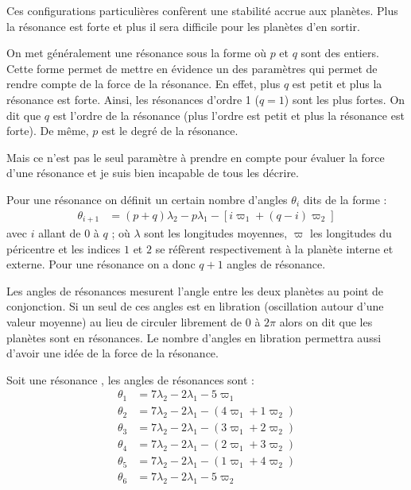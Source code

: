 Ces configurations particulières confèrent une stabilité accrue aux planètes. Plus la résonance est forte et plus il sera difficile pour les planètes d'en sortir.

\bigskip

On met généralement une résonance sous la forme  où $p$ et $q$ sont des entiers. Cette forme permet de mettre en
évidence un des paramètres qui permet de rendre compte de la force de la résonance. En effet, plus $q$ est petit et plus la
résonance est forte. Ainsi, les résonances d'ordre 1 ($q=1$) sont les plus fortes. On dit que $q$ est l'ordre de la résonance
(plus l'ordre est petit et plus la résonance est forte). De même, $p$ est le degré de la résonance.

\begin{attention}
Mais ce n'est pas le seul paramètre à prendre en compte pour évaluer la force d'une résonance et je suis bien incapable de tous les décrire.
\end{attention}

Pour une résonance  on définit un certain nombre d'angles $\theta_i$ dits  de la forme :
\begin{align}
\theta_{i+1} &=(p+q)\lambda_2 -p\lambda_1 - \left[i\varpi_{1} + (q-i)\varpi_2\right]
\end{align}
avec $i$ allant de $0$ à $q$ ; où $\lambda$ sont les longitudes moyennes, $\varpi$ les longitudes du péricentre et les indices
$1$ et $2$ se réfèrent respectivement à la planète interne et externe. Pour une résonance  on a donc $q+1$ angles
de résonance.

Les angles de résonances mesurent l'angle entre les deux planètes au point de conjonction. Si un seul de ces angles est en libration (oscillation autour d'une valeur moyenne) au lieu de circuler librement de $0$ à $2\pi$ alors on dit que les planètes sont en résonances. Le nombre d'angles en libration permettra aussi d'avoir une idée de la force de la résonance.

\begin{exemple}
Soit une résonance , les angles de résonances sont :
\begin{align*}
\theta_1 &= 7 \lambda_2 -2\lambda_1 - 5 \varpi_1\\
\theta_2 &= 7 \lambda_2 -2\lambda_1 - \left( 4 \varpi_1 + 1\varpi_2 \right)\\
\theta_3 &= 7 \lambda_2 -2\lambda_1 - \left( 3 \varpi_1 + 2\varpi_2 \right)\\
\theta_4 &= 7 \lambda_2 -2\lambda_1 - \left( 2 \varpi_1 + 3\varpi_2 \right)\\
\theta_5 &= 7 \lambda_2 -2\lambda_1 - \left( 1 \varpi_1 + 4\varpi_2 \right)\\
\theta_6 &= 7 \lambda_2 -2\lambda_1 - 5 \varpi_2
\end{align*}
\end{exemple}

